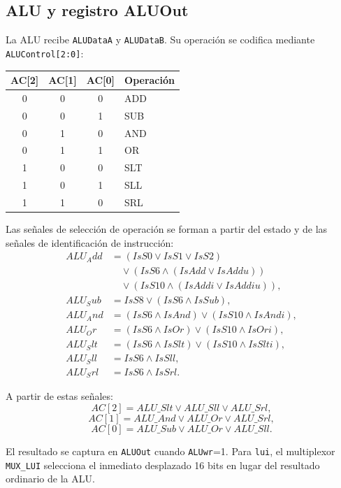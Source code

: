 \documentclass[11pt,a4paper]{article}
\begin{document}
\subsection{ALU y registro ALUOut}

La ALU recibe \texttt{ALUDataA} y \texttt{ALUDataB}. Su operación se codifica mediante \texttt{ALUControl[2:0]}:
\begin{center}
    \begin{tabular}{ccc l}
        \toprule
        \textbf{AC[2]} & \textbf{AC[1]} & \textbf{AC[0]} & \textbf{Operación} \\
        \midrule
        0 & 0 & 0 & ADD \\
        0 & 0 & 1 & SUB \\
        0 & 1 & 0 & AND \\
        0 & 1 & 1 & OR \\
        1 & 0 & 0 & SLT \\
        1 & 0 & 1 & SLL \\
        1 & 1 & 0 & SRL \\
        \bottomrule
    \end{tabular}
\end{center}

Las señales de selección de operación se forman a partir del estado y de las señales de identificación de instrucción:
\begin{align*}
    ALU_Add &= (IsS0\lor IsS1\lor IsS2)\\
        &\quad\lor(IsS6\land(IsAdd\lor IsAddu))\\
        &\quad\lor(IsS10\land(IsAddi\lor IsAddiu)),\\
    ALU_Sub &= IsS8\lor(IsS6\land IsSub),\\
    ALU_And &= (IsS6\land IsAnd)\lor(IsS10\land IsAndi),\\
    ALU_Or &= (IsS6\land IsOr)\lor(IsS10\land IsOri),\\
    ALU_Slt &= (IsS6\land IsSlt)\lor(IsS10\land IsSlti),\\
    ALU_Sll &= IsS6\land IsSll,\\
    ALU_Srl &= IsS6\land IsSrl.
\end{align*}

A partir de estas señales:
\[
AC[2]=ALU\_Slt\lor ALU\_Sll\lor ALU\_Srl,
\]
\[
AC[1]=ALU\_And\lor ALU\_Or\lor ALU\_Srl,
\]
\[
AC[0]=ALU\_Sub\lor ALU\_Or\lor ALU\_Sll.
\]

El resultado se captura en \texttt{ALUOut} cuando \texttt{ALUwr}=1. Para \texttt{lui}, el multiplexor \texttt{MUX\_LUI} selecciona el inmediato desplazado 16 bits en lugar del resultado ordinario de la ALU.
\end{document}
